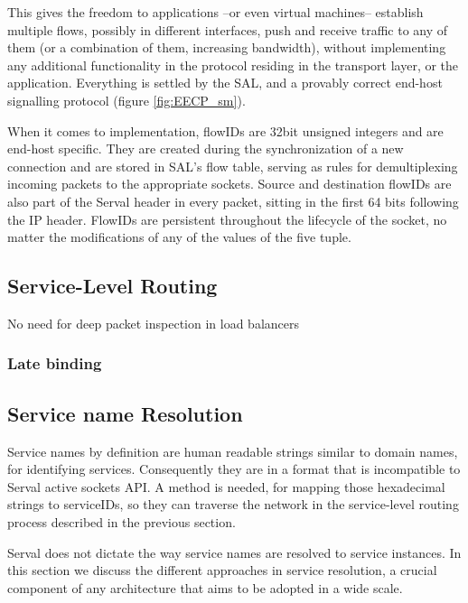 This gives the freedom to applications --or even virtual machines-- establish multiple flows, possibly in different interfaces, push and receive traffic to any of them (or a combination of them, increasing bandwidth), without implementing any additional functionality in the protocol residing in the transport layer, or the application.
Everything is settled by the SAL, and a provably correct end-host signalling protocol (figure \ref{fig:EECP_sm}).

When it comes to implementation, flowIDs are 32bit unsigned integers and are end-host specific.
They are created during the synchronization of a new connection and are stored in SAL's flow table, serving as rules for demultiplexing incoming packets to the appropriate sockets.
Source and destination flowIDs are also part of the Serval header in every packet, sitting in the first 64 bits following the IP header.
FlowIDs are persistent throughout the lifecycle of the socket, no matter the modifications of any of the values of the five tuple.



\subsection{Service-Level Routing} 
No need for deep packet inspection in load balancers



\subsubsection{Late binding}



\subsection{Service name Resolution}
Service names by definition are human readable strings similar to domain names, for identifying services.
Consequently they are in a format that is incompatible to Serval active sockets API.
A method is needed, for mapping those hexadecimal strings to serviceIDs, so they can traverse the network in the service-level routing process described in the previous section.

Serval does not dictate the way service names are resolved to service instances.
In this section we discuss the different approaches in service resolution, a crucial component of any architecture that aims to be adopted in a wide scale.

